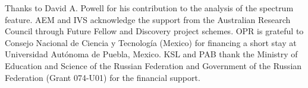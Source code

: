 \documentclass[aps,prl,twocolumn,showpacs,superscriptaddress,groupedaddress]{revtex4-1}  %
\begin{document}
\begin{acknowledgments}
  Thanks to David A. Powell for his contribution to the analysis of
  the spectrum feature.  AEM and IVS acknowledge the support from the
  Australian Research Council through Future Fellow and Discovery
  project schemes. OPR is grateful to Consejo Nacional de Ciencia y
  Tecnolog\'{i}a (Mexico) for financing a short stay at Universidad
  Autónoma de Puebla, Mexico.  KSL and PAB thank the Ministry of
  Education and Science of the Russian Federation and Government of
  the Russian Federation (Grant 074-U01) for the financial support.
\end{acknowledgments}


\end{document}
